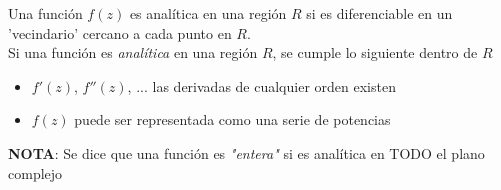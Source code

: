 
Una función $f(z)$ es analítica en una región $R$ si es diferenciable en un 'vecindario' cercano a cada punto en $R$. \\

Si una función es \textit{analítica} en una región $R$, se cumple lo siguiente dentro de $R$

\begin{itemize}
  \item $f'(z)$, $f''(z)$, $...$ las derivadas de cualquier orden existen
  \item $f(z)$ puede ser representada como una serie de potencias
\end{itemize}

\textbf{NOTA}: Se dice que una función es \textit{"entera"} si es analítica en TODO el plano complejo